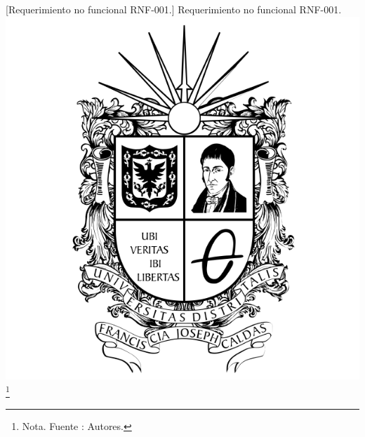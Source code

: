 {\begin{enumerate}
        
        \vspace{2mm}
        \begin{minipage}{0.9\textwidth}
        \centering
        [{Requerimiento no funcional RNF-001.}]{ Requerimiento no funcional RNF-001. }
        \label{reqnf1}
         \includegraphics[width=1\textwidth]{Content/Images/Escudo_UD.png}
        \footnote{Nota. \textup{Fuente : Autores.}}
        \end{minipage}
        

\end{enumerate}}
